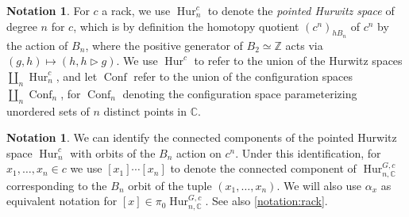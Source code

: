 \documentclass[12 pt]{amsart}
\theoremstyle{plain}
\theoremstyle{definition}
\newtheorem{definition}[theorem]{Definition}
\newtheorem{notation}[theorem]{Notation}
\theoremstyle{remark}
\numberwithin{equation}{section}
\DeclareMathOperator\Aut{Aut}
\DeclareMathOperator\Hur{Hur}
\DeclareMathOperator\Conf{Conf}
\newcommand{\phur}[4]{\operatorname{Hur}^{#1, #3}_{#2,#4}}
\begin{document}

\begin{notation}
	\label{notation:hurwitz-union}
	For $c$ a rack, we use $\Hur^c_n$ to denote the {\em pointed Hurwitz
	space} of degree $n$ for $c$, which is by definition the homotopy quotient
	$(c^n)_{hB_n}$ of $c^n$ by the action of $B_n$, where the positive generator of $B_2 \simeq \mathbb Z$ acts
	via $(g, h) \mapsto (h, h \triangleright g)$.
We use $\Hur^{c}$ to refer to the union of the Hurwitz spaces
$\coprod_n\Hur_n^{c}$, and let $\Conf$ refer to the union of the configuration
spaces $\coprod_n\Conf_n$, for $\Conf_n$ denoting the configuration space
parameterizing unordered sets of $n$ distinct points in $\mathbb C$.
\end{notation}
\begin{notation}
	\label{notation:component-rack}
We can identify the connected components of the pointed Hurwitz space
$\Hur^c_n$ with orbits of the $B_n$ action on $c^n$.
Under this identification, for
$x_1, \ldots, x_n \in c$ we use $[x_1] \cdots [x_n]$ to denote the
connected component of $\phur G n c {\mathbb C}$ corresponding to the
$B_n$ orbit of the tuple $(x_1, \ldots, x_n)$.
We will also use $\alpha_x$ as equivalent notation for $[x] \in \pi_0 \phur G n
c {\mathbb C}$.
See also \autoref{notation:rack}.
\end{notation}

%
\end{document}
